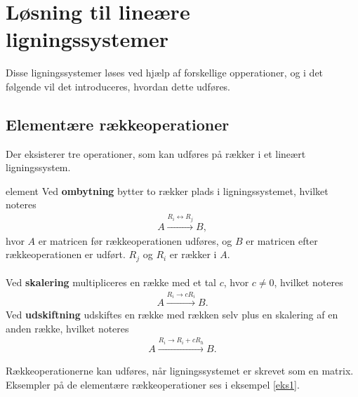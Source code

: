 \section{Løsning til lineære ligningssystemer}
%
Disse ligningssystemer løses ved hjælp af forskellige opperationer, og i det følgende vil det introduceres, hvordan dette udføres.
%
\subsection{Elementære rækkeoperationer}
Der eksisterer tre operationer, som kan udføres på rækker i et lineært ligningssystem.
%
\begin{defn}{}{element}
Ved \textbf{ombytning} bytter to rækker plads i ligningssystemet, hvilket noteres
\begin{align*}
A \xrightarrow{R_i \leftrightarrow R_j} B, 
\end{align*}
hvor $A$ er matricen før rækkeoperationen udføres, og $B$ er matricen efter rækkeoperationen er udført. 
$R_j$ og $R_i$ er rækker i $A$.\\\\
Ved \textbf{skalering} multipliceres en række med et tal $c$, hvor $c \neq 0$, hvilket noteres
\begin{align*}
A \xrightarrow{R_i \rightarrow cR_i} B.
\end{align*}
Ved \textbf{udskiftning} udskiftes en række med rækken selv plus en skalering af en anden række, hvilket noteres
\begin{align*}
A \xrightarrow{R_i \rightarrow R_i + cR_h} B.
\end{align*}
%
\end{defn}
\noindent
Rækkeoperationerne kan udføres, når ligningssystemet er skrevet som en matrix. Eksempler på de elementære rækkeoperationer ses i eksempel \ref{eks1}.
\\
%
%
